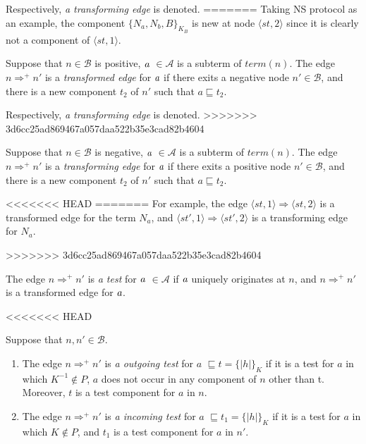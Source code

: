 Respectively, \textit{a transforming edge} is denoted. 
=======
Taking NS protocol as an example, the component $\{N_a,N_b,B\}_{K_B}$ is new at node $\langle st,2 \rangle$ since it is clearly not a component of $\langle st,1 \rangle$. 

\begin{Definition} Suppose that $n \in \mathcal{B}$ is positive, $\emph{a}$ $\in \mathcal{A}$ is a subterm of $term(n)$. The edge $n \Rightarrow^+ n'$ is a \emph{transformed edge} for $\emph{a}$ if there exits a negative node $n' \in \mathcal{B}$, and there is a new component $t_2$ of $n'$ such that $a \sqsubseteq t_2$.
\end{Definition}

Respectively, \textit{a transforming edge} is denoted.
>>>>>>> 3d6cc25ad869467a057daa522b35e3cad82b4604

\begin{Definition} Suppose that $n \in \mathcal{B}$ is negative, $\emph{a}$ $\in \mathcal{A}$ is a subterm of $term(n)$. The edge $n \Rightarrow^+ n'$ is a \emph{transforming edge} for $\emph{a}$ if there exits a positive node $n' \in \mathcal{B}$, and there is a new component $t_2$ of $n'$ such that $a \sqsubseteq t_2$.
\end{Definition}

<<<<<<< HEAD
=======
 For example, the edge $\langle st,1\rangle \Rightarrow \langle st,2\rangle$ is a transformed edge for the term $N_a$, and  $\langle st',1\rangle \Rightarrow \langle st',2\rangle$ is a transforming edge for $N_a$. 

>>>>>>> 3d6cc25ad869467a057daa522b35e3cad82b4604
\begin{Definition} 
The edge $n \Rightarrow^+ n'$ is \emph{a test} for $\emph{a}$ $\in \mathcal{A}$ if $\emph{a}$ uniquely originates at $n$, and $n \Rightarrow^+ n'$ is a transformed edge for $\emph{a}$. 
\end{Definition}

<<<<<<< HEAD
\begin{Definition} Suppose that $n, n' \in \mathcal{B}$.
\begin{enumerate}
\item The edge $n \Rightarrow^+ n'$ is \emph{a outgoing test} for $a$ $\sqsubseteq t = \{|h|\}_K$ if it is a test for $a$ in which $K^{-1} \not\in P$, $a$ does not occur in any component of $n$ other than t. Moreover, $t$ is a test component for $a$ in $n$.
\item The edge $n \Rightarrow^+ n'$ is \emph{a incoming test} for $a$ $\sqsubseteq t_1 = \{|h|\}_K$ if it is a test for $a$ in which $K \not\in P$, and $t_1$ is a test component for $a$ in $n'$.
\end{enumerate}
\end{Definition}

